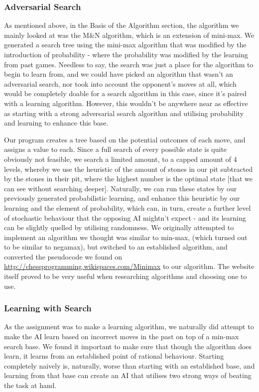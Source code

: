\documentclass[11pt]{article}
\begin{document}
\subsubsection{Adversarial Search}
\label{sec-3-2-2}

As mentioned above, in the Basis of the Algorithm section, the algorithm we mainly looked at was the M\&N algorithm, which is an extension of mini-max. We generated a search tree using the mini-max algorithm that was modified by the introduction of probability - where the probability was modified by the learning from past games. Needless to say, the search was just a place for the algorithm to begin to learn from, and we could have picked an algorithm that wasn't an adversarial search, nor took into account the opponent's moves at all, which would be completely doable for a search algorithm in this case, since it's paired with a learning algorithm. However, this wouldn't be anywhere near as effective as starting with a strong adversarial search algorithm and utilising probability and learning to enhance this base.

Our program creates a tree based on the potential outcomes of each move, and assigns a value to each. Since a full search of every possible state is quite obviously not feasible, we search a limited amount, to a capped amount of 4 levels, whereby we use the heuristic of the amount of stones in our pit subtracted by the stones in their pit, where the highest number is the optimal state [that we can see without searching deeper]. Naturally, we can run these states by our previously generated probabilistic learning, and enhance this heuristic by our learning and the element of probability, which can, in turn, create a further level of stochastic behaviour that the opposing AI mightn't expect - and its learning can be slightly quelled by utilising randomness. We originally attempted to implement an algorithm we thought was similar to min-max, (which turned out to be similar to negamax), but switched to an established algorithm, and converted the pseudocode we found on \url{http://chessprogramming.wikispaces.com/Minimax} to our algorithm. The website itself proved to be very useful when researching algorithms and choosing one to use.
\subsubsection{Learning with Search}
\label{sec-3-2-3}

As the assignment was to make a learning algorithm, we naturally did attempt to make the AI learn based on incorrect moves in the past on top of a min-max search base. We found it important to make sure that though the algorithm does learn, it learns from an established point of rational behaviour. Starting completely naively is, naturally, worse than starting with an established base, and learning from that base can create an AI that utilises two strong ways of beating the task at hand.
\end{document}
